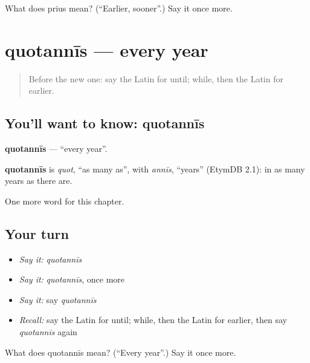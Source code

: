 \begin{tcolorbox}[breakable,colback=teal!4,colframe=teal!35!black,title={Before you move on}]
What does prius mean? (\textquotedblleft{}Earlier, sooner\textquotedblright{}.) Say it once more.
\end{tcolorbox}
\section[quotannīs]{quotannīs — every year}

\label{lesson:LA-C176-quotannis}



\begin{quote}
Before the new one: say the Latin for until; while, then the Latin for earlier.
\end{quote}

\subsection*{You'll want to know: quotannīs}
\textbf{quotannīs} — \textquotedblleft{}every year\textquotedblright{}.

\begin{cousinweb}
\textbf{quotannīs} is \emph{quot}, \textquotedblleft{}as many as\textquotedblright{}, with \emph{annīs}, \textquotedblleft{}years\textquotedblright{} (EtymDB 2.1): in as many years as there are.
\end{cousinweb}

\begin{grammarlens}[title={What you've built}]
One more word for this chapter.
\end{grammarlens}

\subsection*{Your turn}
\begin{itemize}
\raggedright
  \item \emph{Say it:} \emph{quotannīs}
  \item \emph{Say it:} \emph{quotannīs}, once more
  \item \emph{Say it:} say \emph{quotannīs}
  \item \emph{Recall:} say the Latin for until; while, then the Latin for earlier, then say \emph{quotannīs} again
\end{itemize}

\begin{tcolorbox}[breakable,colback=teal!4,colframe=teal!35!black,title={Before you move on}]
What does quotannīs mean? (\textquotedblleft{}Every year\textquotedblright{}.) Say it once more.
\end{tcolorbox}
